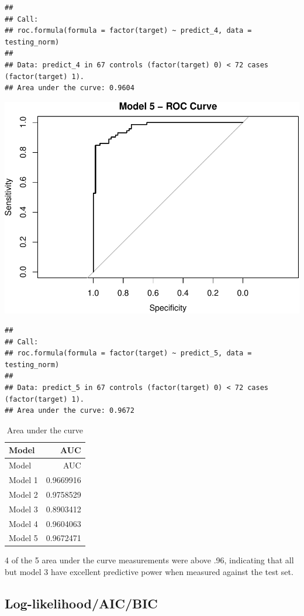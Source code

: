 \documentclass[]{article}
\begin{document}
\begin{verbatim}
## 
## Call:
## roc.formula(formula = factor(target) ~ predict_4, data = testing_norm)
## 
## Data: predict_4 in 67 controls (factor(target) 0) < 72 cases (factor(target) 1).
## Area under the curve: 0.9604
\end{verbatim}

\includegraphics{HW3_Final_files/figure-latex/unnamed-chunk-19-5.pdf}

\begin{verbatim}
## 
## Call:
## roc.formula(formula = factor(target) ~ predict_5, data = testing_norm)
## 
## Data: predict_5 in 67 controls (factor(target) 0) < 72 cases (factor(target) 1).
## Area under the curve: 0.9672
\end{verbatim}

\begin{longtable}[c]{@{}lr@{}}
\caption{Area under the curve}\tabularnewline
\toprule
Model & AUC\tabularnewline
\midrule
\endfirsthead
\toprule
Model & AUC\tabularnewline
\midrule
\endhead
Model 1 & 0.9669916\tabularnewline
Model 2 & 0.9758529\tabularnewline
Model 3 & 0.8903412\tabularnewline
Model 4 & 0.9604063\tabularnewline
Model 5 & 0.9672471\tabularnewline
\bottomrule
\end{longtable}

4 of the 5 area under the curve measurements were above .96, indicating
that all but model 3 have excellent predictive power when measured
against the test set.

\pagebreak

\subsection{Log-likelihood/AIC/BIC}\label{log-likelihoodaicbic}
\end{document}
